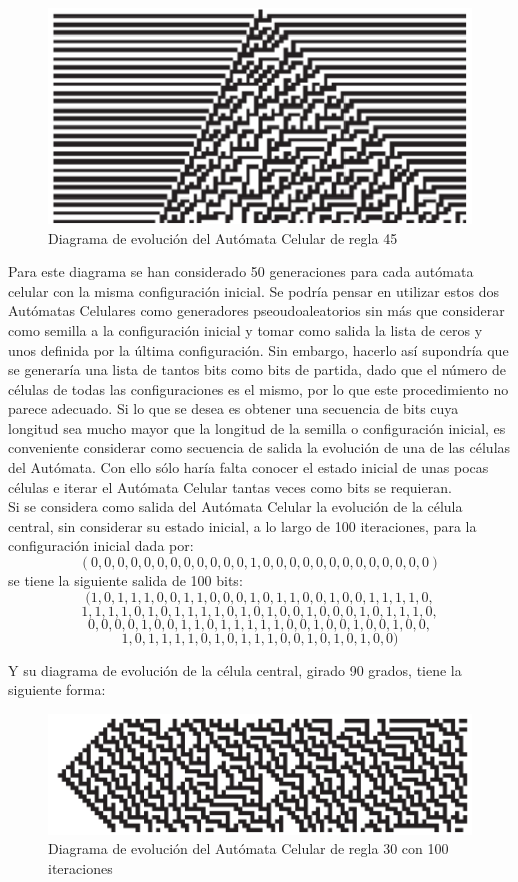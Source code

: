 \begin{figure}[H]
\centering
\includegraphics[scale=0.7]{imagenes/regla_45.png}
\caption{Diagrama de evolución del Autómata Celular de regla 45}
\end{figure}

Para este diagrama se han considerado 50 generaciones para cada autómata celular con la misma configuración inicial. Se podría pensar en utilizar estos dos Autómatas Celulares como generadores pseoudoaleatorios sin más que considerar como semilla a la configuración inicial y tomar como salida la lista de ceros y unos definida por la última configuración. Sin embargo, hacerlo así supondría que se generaría una lista de tantos bits  como bits de partida, dado que el número de células de todas las configuraciones es el mismo, por lo que este procedimiento no parece adecuado. Si lo que se desea es obtener una secuencia de bits cuya longitud sea mucho mayor que la longitud de la semilla o configuración inicial, es conveniente considerar como secuencia de salida la evolución de una de las células del Autómata. Con ello sólo haría falta conocer el estado inicial de unas pocas células e iterar el Autómata Celular tantas veces como bits se requieran.\\

Si se considera como salida del Autómata Celular la evolución de la célula central, sin considerar su estado inicial, a lo largo de 100 iteraciones, para la configuración inicial dada por:
$$(0,0,0,0,0,0,0,0,0,0,0,0,1,0,0,0,0,0,0,0,0,0,0,0,0,0)$$
se tiene la siguiente salida de 100 bits:
$$(1,0,1,1,1,0,0,1,1,0,0,0,1,0,1,1,0,0,1,0,0,1,1,1,1,0,$$
$$1,1,1,1,0,1,0,1,1,1,1,0,1,0,1,0,0,1,0,0,0,1,0,1,1,1,0,$$
$$0,0,0,0,1,0,0,1,1,0,1,1,1,1,1,0,0,1,0,0,1,0,0,1,0,0,$$
$$1,0,1,1,1,1,0,1,0,1,1,1,0,0,1,0,1,0,1,0,0)$$

Y su diagrama de evolución de la célula central, girado 90 grados, tiene la siguiente forma:

\begin{figure}[H]
\centering
\includegraphics[scale=0.7]{imagenes/regla_30_100.png}
\caption{Diagrama de evolución del Autómata Celular de regla 30 con 100 iteraciones}
\end{figure}

